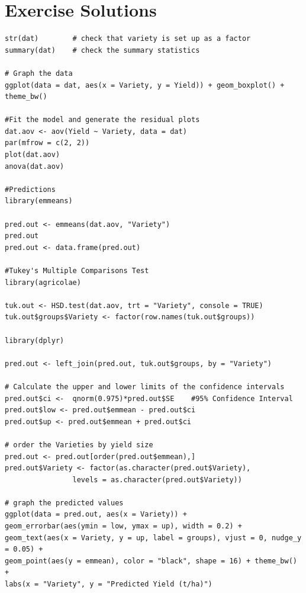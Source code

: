 \documentclass[a4paper, 10pt, fleqn, twosided]{memoir}
\begin{document}
\chapter{Exercise Solutions}
\begin{tcolorbox}[title = Exercise 1 code]
\begin{verbatim}
str(dat)        # check that variety is set up as a factor
summary(dat)    # check the summary statistics

# Graph the data
ggplot(data = dat, aes(x = Variety, y = Yield)) + geom_boxplot() +
theme_bw()

#Fit the model and generate the residual plots
dat.aov <- aov(Yield ~ Variety, data = dat)
par(mfrow = c(2, 2))
plot(dat.aov)
anova(dat.aov)

#Predictions
library(emmeans)

pred.out <- emmeans(dat.aov, "Variety")
pred.out
pred.out <- data.frame(pred.out)

#Tukey's Multiple Comparisons Test
library(agricolae)

tuk.out <- HSD.test(dat.aov, trt = "Variety", console = TRUE)
tuk.out$groups$Variety <- factor(row.names(tuk.out$groups))

library(dplyr)

pred.out <- left_join(pred.out, tuk.out$groups, by = "Variety")

# Calculate the upper and lower limits of the confidence intervals
pred.out$ci <-  qnorm(0.975)*pred.out$SE    #95% Confidence Interval
pred.out$low <- pred.out$emmean - pred.out$ci
pred.out$up <- pred.out$emmean + pred.out$ci

# order the Varieties by yield size
pred.out <- pred.out[order(pred.out$emmean),]
pred.out$Variety <- factor(as.character(pred.out$Variety),
                levels = as.character(pred.out$Variety))
 
# graph the predicted values 
ggplot(data = pred.out, aes(x = Variety)) +
geom_errorbar(aes(ymin = low, ymax = up), width = 0.2) +
geom_text(aes(x = Variety, y = up, label = groups), vjust = 0, nudge_y = 0.05) +
geom_point(aes(y = emmean), color = "black", shape = 16) + theme_bw() +
labs(x = "Variety", y = "Predicted Yield (t/ha)")
\end{verbatim}
\end{tcolorbox}
\end{document}
